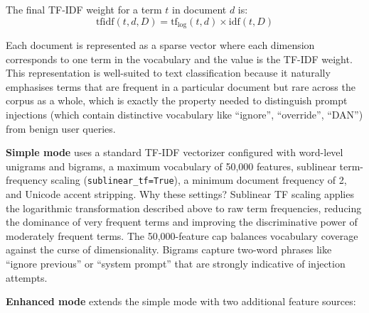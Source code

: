 \documentclass[12pt, letterpaper]{article}   %
\begin{document}
The final TF-IDF weight for a term $t$ in document $d$ is:
\[
    \text{tfidf}(t, d, D) = \text{tf}_{\log}(t, d) \times \text{idf}(t, D)
\]

Each document is represented as a sparse vector where each dimension corresponds to one term in the vocabulary and the value is the TF-IDF weight. This representation is well-suited to text classification because it naturally emphasises terms that are frequent in a particular document but rare across the corpus as a whole, which is exactly the property needed to distinguish prompt injections (which contain distinctive vocabulary like ``ignore'', ``override'', ``DAN'') from benign user queries.

\textbf{Simple mode} uses a standard TF-IDF vectorizer configured with word-level unigrams and bigrams, a maximum vocabulary of 50,000 features, sublinear term-frequency scaling (\texttt{sublinear\_tf=True}), a minimum document frequency of 2, and Unicode accent stripping. Why these settings? Sublinear TF scaling applies the logarithmic transformation described above to raw term frequencies, reducing the dominance of very frequent terms and improving the discriminative power of moderately frequent terms. The 50,000-feature cap balances vocabulary coverage against the curse of dimensionality. Bigrams capture two-word phrases like ``ignore previous'' or ``system prompt'' that are strongly indicative of injection attempts.

\textbf{Enhanced mode} extends the simple mode with two additional feature sources:
\end{document}
